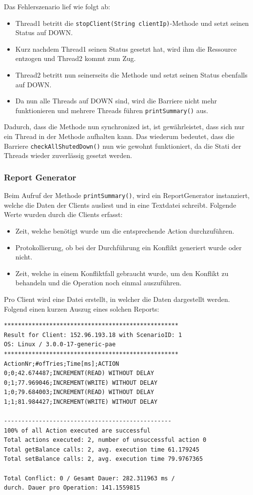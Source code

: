 Das Fehlerszenario lief wie folgt ab:
\begin{itemize}
\item Thread1 betritt die \texttt{stopClient(String clientIp)}-Methode und setzt seinen Status auf DOWN.
\item Kurz nachdem Thread1 seinen Status gesetzt hat, wird ihm die Res\-sour\-ce entzogen und Thread2 kommt zum Zug.
\item Thread2 betritt nun seinerseits die Methode und setzt seinen Status ebenfalls auf DOWN.
\item Da nun alle Threads auf DOWN sind, wird die Barriere nicht mehr funktionieren und mehrere Threads führen \texttt{printSummary()} aus.
\end{itemize}
Dadurch, dass die Methode nun synchronized ist, ist gewährleistet, dass sich nur ein Thread in der Methode aufhalten kann. Das wiederum bedeutet, dass die Barriere \texttt{checkAllShutedDown()} nun wie gewohnt funktioniert, da die Stati der Threads wieder zuverlässig gesetzt werden.

\subsubsection{Report Generator}
\label{sec:reportGenerator}

Beim Aufruf der Methode \texttt{printSummary()}, wird ein ReportGenerator instanziert, welche die Daten der Clients ausliest und in eine Textdatei schreibt. Folgende Werte wurden durch die Clients erfasst:
\begin{itemize}
\item Zeit, welche benötigt wurde um die entsprechende Action durch\-zu\-führen.
\item Protokollierung, ob bei der Durchführung ein Konflikt generiert wurde oder nicht.
\item Zeit, welche in einem Konfliktfall gebraucht wurde, um den Konflikt zu behandeln und die Operation noch einmal auszuführen.
\end{itemize}

Pro Client wird eine Datei erstellt, in welcher die Daten dargestellt werden. Folgend einen kurzen Auszug eines solchen Reports:

\begin{verbatim}
**************************************************
Result for Client: 152.96.193.18 with ScenarioID: 1
OS: Linux / 3.0.0-17-generic-pae
**************************************************
ActionNr;#ofTries;Time[ms];ACTION
0;0;42.674487;INCREMENT(READ) WITHOUT DELAY
0;1;77.969046;INCREMENT(WRITE) WITHOUT DELAY
1;0;79.684003;INCREMENT(READ) WITHOUT DELAY
1;1;81.984427;INCREMENT(WRITE) WITHOUT DELAY

------------------------------------------------
100% of all Action executed are successful
Total actions executed: 2, number of unsuccessful action 0
Total getBalance calls: 2, avg. execution time 61.179245
Total setBalance calls: 2, avg. execution time 79.9767365

Total Conflict: 0 / Gesamt Dauer: 282.311963 ms / 
durch. Dauer pro Operation: 141.1559815
\end{verbatim}

